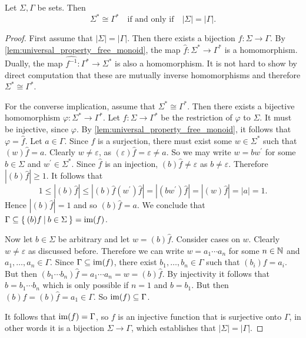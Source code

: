\begin{lemma}\label{lem:free_monoid_isomorphism_condition}
  Let $\Sigma, \Gamma$ be sets. Then
  \[\Sigma^\ast \cong \Gamma^\ast \quad \text{if and only if} \quad
  |\Sigma| = |\Gamma|.\]
\end{lemma}
\begin{proof}
  First assume that $|\Sigma| = |\Gamma|$. Then there exists a bijection
  $f: \Sigma \rightarrow \Gamma$. By \cref{lem:universal_property_free_monoid}, the map
  $\widehat{f}: \Sigma^\ast \rightarrow \Gamma^\ast$ is a homomorphism. Dually, the map
  $\widehat{f^{-1}}: \Gamma^\ast \rightarrow \Sigma^\ast$ is also a homomorphism. It is not hard to
  show by direct computation that
  these are mutually inverse homomorphisms and therefore $\Sigma^\ast \cong \Gamma^\ast$.

  For the converse implication, assume that $\Sigma^\ast \cong \Gamma^\ast$. Then there exists a
  bijective homomorphism $\varphi: \Sigma^\ast \rightarrow \Gamma^\ast$.
  Let $f: \Sigma \rightarrow \Gamma^\ast$ be the restriction of $\varphi$ to $\Sigma$. It must be
  injective, since $\varphi$. By \cref{lem:universal_property_free_monoid}, it follows that
  $\varphi = \widehat{f}$. Let $a\in \Gamma$. Since $\widehat{f}$ is a surjection, there must exist
  some $w\in \Sigma^\ast$ such that
  $(w)\widehat{f} = a$. Clearly $w\neq \varepsilon$, as $(\varepsilon)\widehat{f} = \varepsilon \neq a$.
  So we may write $w = b w^\prime$ for some $b\in \Sigma$ and $w^\prime\in \Sigma^\ast$. Since
  $\widehat{f}$ is an injection, $(b)\widehat{f}\neq \varepsilon$ as $b\neq \varepsilon$. Therefore
  $|(b)\widehat{f}| \geq 1$.
  It follows that
  \[
    1 \leq |(b)\widehat{f}| \leq |(b)\widehat{f} (w^\prime)\widehat{f}| = |(bw^\prime)\widehat{f}| =
    |(w)\widehat{f}| = |a| = 1.
  \]
  Hence $|(b)\widehat{f}| = 1$ and so $(b)\widehat{f} = a$.
  We conclude that $\Gamma \subseteq \left\{\: (b)f \: \middle|\: b \in \Sigma \:\right\} = \textrm{im}(f)$.

  Now let $b\in \Sigma$ be arbitrary and let $w = (b)\widehat{f}$. Consider cases on $w$. Clearly
  $w\neq \varepsilon$ as discussed before.
  Therefore we can write $w = a_1 \cdots a_n$ for some $n\in \mathbb{N}$ and
  $a_1, \ldots, a_n \in \Gamma$. Since $\Gamma\subseteq \textrm{im}(f)$,
  there exist $b_1, \ldots, b_n\in \Gamma$ such that $(b_i)f = a_i$.
  But then $(b_1\cdots b_n)\widehat{f} = a_1\cdots a_n = w = (b)\widehat{f}$. By injectivity it
  follows that $b = b_1\cdots b_n$ which is only possible if $n = 1$ and $b = b_1$. But then
  $(b)f = (b)\widehat{f} = a_1 \in \Gamma$. So $\textrm{im}(f)\subseteq \Gamma$.

  It follows that $\textrm{im}(f) = \Gamma$, so $f$ is an injective function that is surjective onto
  $\Gamma$, in other words it is a bijection $\Sigma \rightarrow \Gamma$, which establishes that
  $|\Sigma| = |\Gamma|$.
\end{proof}

